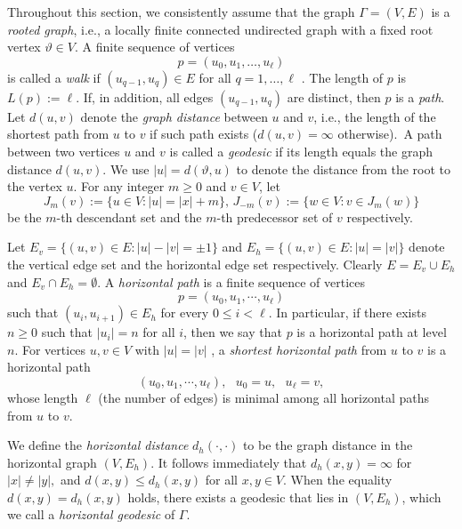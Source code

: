 \documentclass[reqno]{amsart}
\theoremstyle{plain}
\numberwithin{equation}{section}
\begin{document}
Throughout this section, we consistently assume that the graph $\Gamma
=(V,E) $ is a \emph{rooted graph}, i.e., a locally finite connected
undirected graph with a fixed root vertex $\vartheta \in V$. A finite
sequence of vertices 
\begin{equation*}
p=(u_{0},u_{1},\dots ,u_{\ell })
\end{equation*}%
is called a \emph{walk} if $(u_{q-1},u_{q})\in E$ for all $q=1,\dots ,\ell $%
. The length of $p$ is $L(p):=\ell $. If, in addition, all edges $%
(u_{q-1},u_{q})$ are distinct, then $p$ is a \emph{path}. Let $d(u,v)$
denote the \emph{graph distance} between $u$ and $v$, i.e., the length of
the shortest path from $u$ to $v$ if such path exists ($d(u,v)=\infty $
otherwise).\ A path between two vertices $u$ and $v$ is called a \emph{%
geodesic} if its length equals the graph distance $d(u,v)$. We use $%
\left\vert u\right\vert =d(\vartheta ,u)$ to denote the distance from the
root to the vertex $u$. For any integer $m\geq 0$ and $v\in V$, let 
\begin{equation*}
J_{m}(v):=\{u\in V:\left\vert u\right\vert =\left\vert x\right\vert
+m\},\,J_{-m}(v):=\{w\in V:v\in J_{m}(w)\}
\end{equation*}%
be the $m$-th descendant set and the $m$-th predecessor set of $v$
respectively.

Let $E_{v}=\{(u,v)\in E:\left\vert u\right\vert -\left\vert v\right\vert
=\pm 1\}$ and $E_{h}=\{(u,v)\in E:\left\vert u\right\vert =\left\vert
v\right\vert \}$ denote the vertical edge set and the horizontal edge set
respectively. Clearly $E=E_{v}\cup E_{h}$ and $E_{v}\cap E_{h}=\emptyset $.
A \emph{horizontal path }is a finite sequence of vertices 
\begin{equation*}
p=(u_{0},u_{1},\cdots ,u_{\ell })
\end{equation*}%
such that $(u_{i},u_{i+1})\in E_{h}$ for every $0\leq i<\ell $. In
particular, if there exists $n\geq 0$ such that $\left\vert u_{i}\right\vert
=n$ for all $i$, then we say that $p$ is a horizontal path at level $n$. For
vertices $u,v\in V$ with $\left\vert u\right\vert =\left\vert v\right\vert $%
, a \emph{shortest horizontal path} from $u$ to $v$ is a horizontal path 
\begin{equation*}
(u_{0},u_{1},\cdots ,u_{\ell }),\text{ }u_{0}=u,\text{ }u_{\ell }=v,
\end{equation*}%
whose length $\ell $ (the number of edges) is minimal among all horizontal
paths from $u$ to $v$.

We define the \emph{horizontal distance }$d_{h}(\cdot ,\cdot )$ to be the
graph distance in the horizontal graph $(V,E_{h}).$ It follows immediately
that $d_{h}(x,y)=\infty $ for $\left\vert x\right\vert \neq \left\vert
y\right\vert ,$ and $d(x,y)\leq d_{h}(x,y)$ for all $x,y\in V$. When the
equality $d(x,y)=d_{h}(x,y)$ holds, there exists a geodesic that lies in $%
(V,E_{h})$, which we call a \emph{horizontal geodesic} of $\Gamma $.
\end{document}

